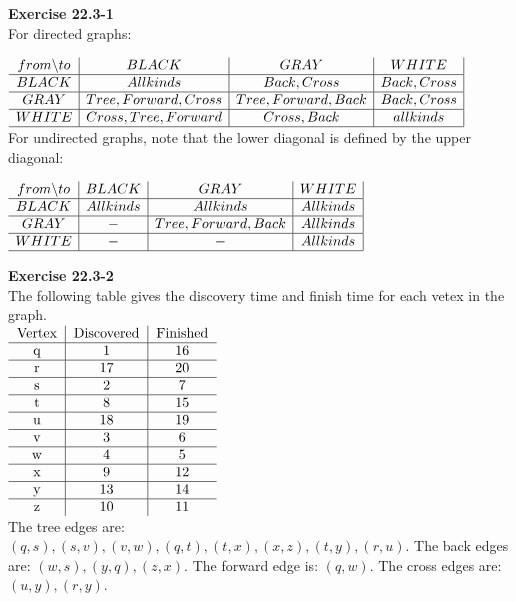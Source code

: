 \documentclass{article}
\begin{document}
\noindent\textbf{Exercise 22.3-1}\\
For directed graphs:

$
\begin{array}{c|c|c|c|}
from\backslash to& BLACK&GRAY&WHITE\\
\hline
BLACK&All kinds& Back, Cross& Back, Cross\\
\hline
GRAY&Tree, Forward, Cross&Tree, Forward, Back&Back, Cross\\
\hline
WHITE&Cross, Tree, Forward&Cross, Back&all kinds\\
\hline
\end{array}
$\\

For undirected graphs, note that the lower diagonal is defined by the upper diagonal:

$
\begin{array}{c|c|c|c|}
from\backslash to& BLACK&GRAY&WHITE\\
\hline
BLACK&All kinds&All kinds&All kinds\\
\hline
GRAY&-&Tree, Forward, Back&All kinds\\
\hline
WHITE&-&-&All kinds\\
\hline
\end{array}
$

\noindent\textbf{Exercise 22.3-2}\\

The following table gives the discovery time and finish time for each vetex in the graph. \\

$\begin{tabular}{c|c|c} 
Vertex & Discovered & Finished \\ \hline
q & 1 & 16 \\ \hline
r & 17 & 20 \\ \hline
s & 2 & 7 \\ \hline
t & 8 & 15 \\ \hline
u & 18 & 19 \\ \hline
v & 3 & 6 \\ \hline
w & 4 & 5 \\ \hline
x & 9 & 12 \\ \hline
y & 13 & 14 \\ \hline
z & 10 & 11 \\ 
\end{tabular}$\\

The tree edges are: $(q,s), (s,v), (v,w), (q,t), (t,x), (x,z), (t,y), (r,u)$.  The back edges are: $(w,s), (y,q), (z,x) $. The forward edge is: $(q,w)$.  The cross edges are: $(u,y), (r,y)$. \\
\end{document}
